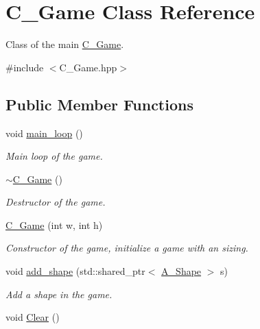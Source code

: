 \hypertarget{classGame}{}\section{C_Game Class Reference}
\label{classGame}


Class of the main \hyperlink{classGame}{C_Game}.




{\ttfamily \#include $<$C_Game.\+hpp$>$}

\subsection*{Public Member Functions}
\begin{DoxyCompactItemize}
\item 
\mbox{\label{classGame_a9e9a77d478f0c0bfb9b61fb1a6556e15}} 
void \hyperlink{classGame_a9e9a77d478f0c0bfb9b61fb1a6556e15}{main\+\_\+loop} ()
\begin{DoxyCompactList}\small\item\em Main loop of the game. \end{DoxyCompactList}\item 
\mbox{\label{classGame_ae3d112ca6e0e55150d2fdbc704474530}} 
\hyperlink{classGame_ae3d112ca6e0e55150d2fdbc704474530}{$\sim$\+C_Game} ()
\begin{DoxyCompactList}\small\item\em Destructor of the game. \end{DoxyCompactList}\item 
\hyperlink{classGame_a2b0cb8af7b823a6d595eef9c9641f806}{C_Game} (int w, int h)
\begin{DoxyCompactList}\small\item\em Constructor of the game, initialize a game with an sizing. \end{DoxyCompactList}\item 
void \hyperlink{classGame_aab43fea0e202c203d998ae575d3f6eeb}{add\+\_\+shape} (std\+::shared\+\_\+ptr$<$ \hyperlink{classShape}{A_Shape} $>$ s)
\begin{DoxyCompactList}\small\item\em Add a shape in the game. \end{DoxyCompactList}\item 
\mbox{\label{classGame_a8ba8d7bcda356ed584dc445184320ff7}} 
void \hyperlink{classGame_a8ba8d7bcda356ed584dc445184320ff7}{Clear} ()

\end{DoxyCompactItemize}
